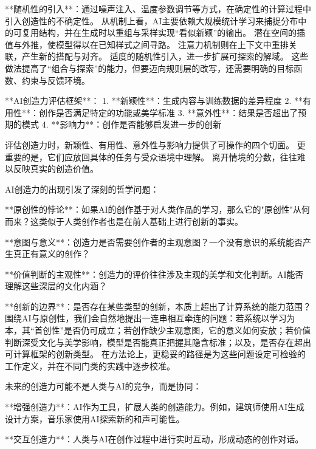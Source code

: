 **随机性的引入**：通过噪声注入、温度参数调节等方式，在确定性的计算过程中引入创造性的不确定性。
从机制上看，AI主要依赖大规模统计学习来捕捉分布中的可复用结构，并在生成时以重组与采样实现“看似新颖”的输出。
潜在空间的插值与外推，使模型得以在已知样式之间寻路。
注意力机制则在上下文中重排关联，产生新的搭配与对齐。
适度的随机性引入，进一步扩展可探索的解域。
这些做法提高了“组合与探索”的能力，但要迈向规则层的改写，还需要明确的目标函数、约束与反馈环境。

\begin{center}
**AI创造力评估框架**：
1. **新颖性**：生成内容与训练数据的差异程度
2. **有用性**：创作是否满足特定的功能或美学标准
3. **意外性**：结果是否超出了预期的模式
4. **影响力**：创作是否能够启发进一步的创新
\end{center}
评估创造力时，新颖性、有用性、意外性与影响力提供了可操作的四个切面。
更重要的是，它们应放回具体的任务与受众语境中理解。
离开情境的分数，往往难以反映真实的创造价值。

AI创造力的出现引发了深刻的哲学问题：

**原创性的悖论**：如果AI的创作基于对人类作品的学习，那么它的"原创性"从何而来？这类似于人类创作者也是在前人基础上进行创新的事实。

**意图与意义**：创造力是否需要创作者的主观意图？一个没有意识的系统能否产生真正有意义的创作？

**价值判断的主观性**：创造力的评价往往涉及主观的美学和文化判断。AI能否理解这些深层的文化内涵？

**创新的边界**：是否存在某些类型的创新，本质上超出了计算系统的能力范围？
围绕AI与原创性，我们会自然地提出一连串相互牵连的问题：若系统以学习为本，其“首创性”是否仍可成立；若创作缺少主观意图，它的意义如何安放；若价值判断深受文化与美学影响，模型是否能真正把握其隐含标准；以及，是否存在超出可计算框架的创新类型。
在方法论上，更稳妥的路径是为这些问题设定可检验的工作定义，并在不同门类的实践中逐步校准。

未来的创造力可能不是人类与AI的竞争，而是协同：

**增强创造力**：AI作为工具，扩展人类的创造能力。例如，建筑师使用AI生成设计方案，音乐家使用AI探索新的和声可能性。

**交互创造力**：人类与AI在创作过程中进行实时互动，形成动态的创作对话。

